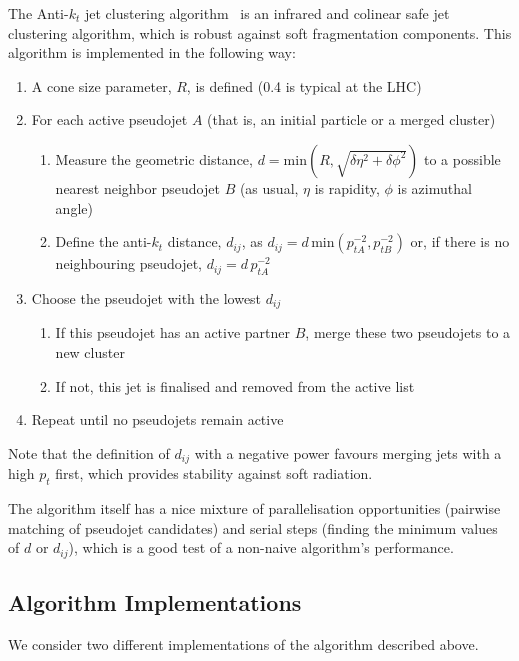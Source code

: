 \documentclass{webofc}
\begin{document}
The Anti-$k_t$ jet clustering algorithm~\cite{Matteo_Cacciari_2008} is an
infrared and colinear safe jet clustering algorithm, which is robust against
soft fragmentation components. This algorithm is implemented in the following
way:

\begin{enumerate}[itemsep=2pt,parsep=2pt,partopsep=0pt]
  \item A cone size parameter, $R$, is defined (0.4 is typical at the LHC)
  \item For each active pseudojet $A$ (that is, an initial particle or a merged cluster)
  \begin{enumerate}
    \item Measure the geometric distance, $d=\mathrm{min}(R, \sqrt{\delta\eta^2 + \delta\phi^2})$ to a possible nearest neighbor pseudojet $B$ (as usual, $\eta$ is rapidity, $\phi$ is azimuthal angle)
    \item Define the anti-$k_t$ distance, $d_{ij}$, as $d_{ij} = d \, \mathrm{min}(p^{-2}_{tA}, p^{-2}_{tB})$ or, if there is no neighbouring pseudojet, $d_{ij} = d \, p^{-2}_{tA}$
  \end{enumerate}
  \item Choose the pseudojet with the lowest $d_{ij}$
  \begin{enumerate}
    \item If this pseudojet has an active partner $B$, merge these two pseudojets to a new cluster
    \item If not, this jet is finalised and removed from the active list
  \end{enumerate}
  \item Repeat until no pseudojets remain active
\end{enumerate}

Note that the definition of $d_{ij}$ with a negative power favours merging jets with a high $p_t$ first, which provides stability against soft radiation.

The algorithm itself has a nice mixture of parallelisation opportunities
(pairwise matching of pseudojet candidates) and serial steps (finding the
minimum values of $d$ or $d_{ij}$), which is a good test of a non-naive
algorithm's performance.

\subsection{Algorithm Implementations}
\label{sec:algimp}

We consider two different implementations of the algorithm described above. 
\end{document}
